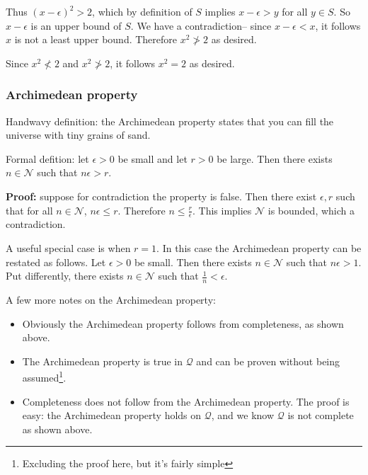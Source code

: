 Thus ${(x-\epsilon)}^{2}>2$, which by definition of $S$ implies
$x-\epsilon>y$ for all $y\in S$. So $x-\epsilon$ is an upper bound of
$S$. We have a contradiction-- since $x-\epsilon<x$, it follows $x$ is not a
least upper bound. Therefore $x^{2}\not>2$ as desired.

\vs

Since $x^{2}\not<2$ and $x^{2}\not>2$, it follows $x^{2}=2$ as
desired.


\subsubsection*{Archimedean property}
Handwavy definition: the Archimedean property states that you can fill
the universe with tiny grains of sand.

\vs

Formal defition: let $\epsilon>0$ be small and let $r>0$ be large. Then there
exists $n\in\mathcal{N}$ such that $n\epsilon>r$.

\vs

\textbf{Proof:} suppose for contradiction the property is false. Then
there exist $\epsilon, r$ such that for all $n\in\mathcal{N}$, $n\epsilon\leq r$. Therefore
$n\leq\frac{r}{\epsilon}$. This implies $\mathcal{N}$ is bounded, which a contradiction.

\vs

A useful special case is when $r=1$. In this case the Archimedean
property can be restated as follows. Let $\epsilon>0$ be small. Then there
exists $n\in\mathcal{N}$ such that $n\epsilon>1$. Put differently, there exists
$n\in\mathcal{N}$ such that $\frac{1}{n}<\epsilon$.

\vs

A few more notes on the Archimedean property:
\begin{itemize}
\item Obviously the Archimedean property follows from completeness, as
  shown above.
\item The Archimedean property is true in $\mathcal{Q}$ and can be proven
  without being assumed\footnote{Excluding the proof here, but it's
    fairly simple}.
\item Completeness does not follow from the Archimedean property. The
  proof is easy: the Archimedean property holds on $\mathcal{Q}$, and we know
  $\mathcal{Q}$ is not complete as shown above.
\end{itemize}


